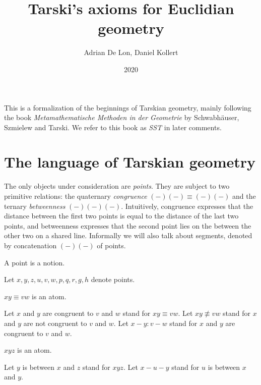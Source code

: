 \documentclass{article}
\title{Tarski's axioms for Euclidian geometry}
\author{Adrian De Lon, Daniel Kollert}
\date{2020}
\newcommand{\Cong}[4]{#1 #2 \equiv #3 #4}
\newcommand{\NotCong}[4]{#1 #2 \not\equiv #3 #4}
\newcommand{\Betw}[3]{#1 #2 #3}
\begin{document}

  \maketitle

  This is a formalization of the beginnings of Tarskian geometry,
  mainly following the book
  \textit{Metamathematische Methoden in der Geometrie}
  by Schwabhäuser, Szmielew and Tarski.
  We refer to this book as \textit{SST} in later comments.


  \section{The language of Tarskian geometry}

  The only objects under consideration are \textit{points}.
  They are subject to two primitive relations:
  the quaternary \textit{congruence} $\Cong{(-)}{(-)}{(-)}{(-)}$
  and the ternary \textit{betweenness} $\Betw{(-)}{(-)}{(-)}$.
  Intuitively, congruence expresses that the distance between the first two points is equal to the distance of the last two points, and betweenness expresses that
  the second point lies on the between the other two on a shared line.
  Informally we will also talk about segments, denoted by concatenation $(-)(-)$ of points.


  \begin{forthel}

    \begin{signature}
      A point is a notion.
    \end{signature}

    Let $x, y, z, u, v, w, p, q, r, g, h$ denote points.


    \begin{signature}
      $\Cong{x}{y}{v}{w}$ is an atom.
    \end{signature}
    Let $x$ and $y$ are congruent to $v$ and $w$ stand for $\Cong{x}{y}{v}{w}$.
    Let $\NotCong{x}{y}{v}{w}$ stand for $x$ and $y$ are not congruent to $v$ and $w$.
    Let $x-y : v-w$ stand for $x$ and $y$ are congruent to $v$ and $w$.

    \begin{signature}
      $\Betw{x}{y}{z}$ is an atom.
    \end{signature}

    Let $y$ is between $x$ and $z$ stand for $\Betw{x}{y}{z}$.
    Let $x-u-y$ stand for $u$ is between $x$ and $y$.
  \end{forthel}
\end{document}
